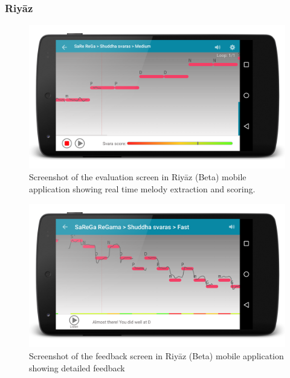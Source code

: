 \subsubsection{Riy\={a}z}
\label{sec:riyaz}



\begin{figure}
	\begin{center}
		\includegraphics[width=\figSizeEightyFive]{ch08_applications/figures/riyaz1.png}
	\end{center}
	\caption{Screenshot of the evaluation screen in Riy\={a}z (Beta) mobile application showing real time melody extraction and scoring.}
	\label{fig:browser_patterns}
\end{figure}
\begin{figure}
	\begin{center}
		\includegraphics[width=\figSizeEightyFive]{ch08_applications/figures/riyaz2.png}
	\end{center}
	\caption{Screenshot of the feedback screen in Riy\={a}z (Beta) mobile application showing detailed feedback}
	\label{fig:browser_patterns}
\end{figure}


